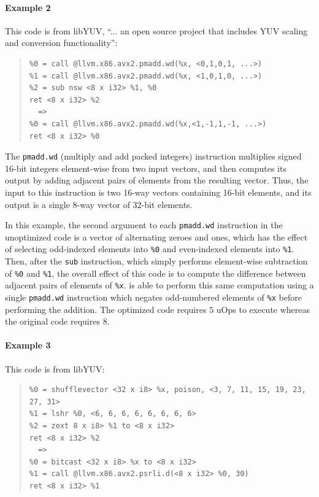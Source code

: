 \paragraph*{Example 2}

This code is from libYUV, ``... an open source project that includes
YUV scaling and conversion
functionality'':

{\begin{quote}\begin{verbatim}
%0 = call @llvm.x86.avx2.pmadd.wd(%x, <0,1,0,1, ...>)
%1 = call @llvm.x86.avx2.pmadd.wd(%x, <1,0,1,0, ...>)
%2 = sub nsw <8 x i32> %1, %0
ret <8 x i32> %2
  =>
%0 = call @llvm.x86.avx2.pmadd.wd(%x,<1,-1,1,-1, ...>)
ret <8 x i32> %0
\end{verbatim}
\end{quote}}

The \texttt{pmadd.wd} (multiply and add packed integers) instruction multiplies
signed 16-bit integers element-wise from two input vectors, and then
computes its output by adding adjacent pairs of elements from the
resulting vector.
%
Thus, the input to this instruction is two 16-way vectors containing
16-bit elements, and its output is a single 8-way vector of 32-bit
elements.


In this example, the second argument to each \texttt{pmadd.wd}
instruction in the unoptimized code is a vector of alternating zeroes
and ones, which has the effect of selecting odd-indexed elements into
\texttt{\%0} and even-indexed elements into \texttt{\%1}.
%
Then, after the \texttt{sub} instruction, which simply performs
element-wise subtraction of \texttt{\%0} and \texttt{\%1}, the overall
effect of this code is to compute the difference between adjacent
pairs of elements of \texttt{\%x}.
%
\minotaur{} is able to perform this same computation using a single
\texttt{pmadd.wd} instruction which negates odd-numbered elements of
\texttt{\%x} before performing the addition.
%
The optimized code requires $5$ uOps to execute whereas the original
code requires $8$.


\paragraph*{Example 3}

This code is from libYUV:

{\begin{quote}\begin{verbatim}
%0 = shufflevector <32 x i8> %x, poison, <3, 7, 11, 15, 19, 23, 27, 31>
%1 = lshr %0, <6, 6, 6, 6, 6, 6, 6, 6>
%2 = zext 8 x i8> %1 to <8 x i32>
ret <8 x i32> %2
  =>
%0 = bitcast <32 x i8> %x to <8 x i32>
%1 = call @llvm.x86.avx2.psrli.d(<8 x i32> %0, 30)
ret <8 x i32> %1
\end{verbatim}
\end{quote}}

